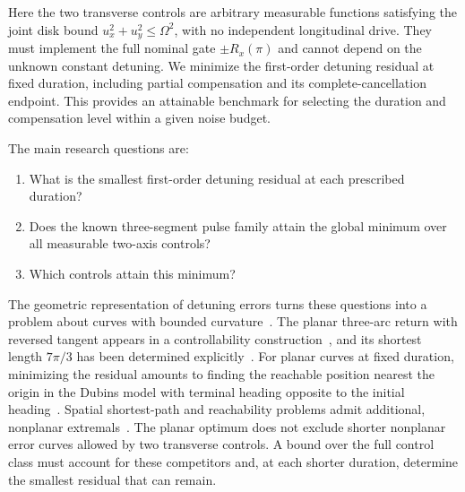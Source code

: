 \documentclass[12pt]{iopjournal}
\begin{document}
Here the two transverse controls are arbitrary measurable functions
satisfying the joint disk bound $u_x^2+u_y^2\le\Omega^2$, with no
independent longitudinal drive. They must implement the full nominal
gate $\pm R_x(\pi)$ and cannot depend on the unknown constant detuning.
We minimize the first-order detuning residual at fixed duration,
including partial compensation and its complete-cancellation endpoint.
This provides an attainable benchmark for selecting the duration and
compensation level within a given noise budget.

The main research questions are:
\begin{enumerate}
\item What is the smallest first-order detuning residual at each
prescribed duration?
\item Does the known three-segment pulse family attain the global
minimum over all measurable two-axis controls?
\item Which controls attain this minimum?
\end{enumerate}

The geometric representation of detuning errors turns these questions
into a problem about curves with bounded
curvature~\cite{zeng2018,zeng2019,piliouras2026}. The planar
three-arc return with reversed tangent appears in a controllability
construction~\cite{sigalotti2006}, and its shortest length $7\pi/3$
has been determined explicitly~\cite{kim2013}.
For planar curves at fixed duration, minimizing the residual amounts
to finding the reachable position nearest the origin in the Dubins
model with terminal heading opposite to the initial
heading~\cite{cockayne1975,patsko2003}.
Spatial shortest-path and reachability problems admit additional,
nonplanar extremals~\cite{sussmann1995,bae2025,bae2026,moser2022}.
The planar optimum does not exclude shorter nonplanar error curves
allowed by two transverse controls. A bound over the full control
class must account for these competitors and, at each shorter
duration, determine the smallest residual that can remain.
\end{document}
